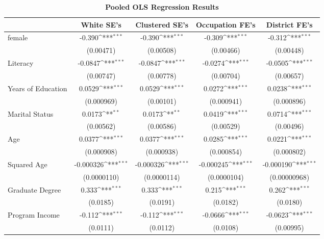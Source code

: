 \begin{table}[htbp]\centering
\def\sym#1{\ifmmode^{#1}\else\(^{#1}\)\fi}
\caption{\textbf{Pooled OLS Regression Results}}
\begin{tabular}{l*{4}{c}}
\hline\hline
                &\multicolumn{1}{c}{\textbf{White SE's}}&\multicolumn{1}{c}{\textbf{Clustered SE's}}&\multicolumn{1}{c}{\textbf{Occupation FE's}}&\multicolumn{1}{c}{\textbf{District FE's}}\\
\hline
female          &   -0.390\sym{***}&   -0.390\sym{***}&   -0.309\sym{***}&   -0.312\sym{***}\\
                &(0.00471)         &(0.00508)         &(0.00466)         &(0.00448)         \\
[1em]
Literacy        &  -0.0847\sym{***}&  -0.0847\sym{***}&  -0.0274\sym{***}&  -0.0505\sym{***}\\
                &(0.00747)         &(0.00778)         &(0.00704)         &(0.00657)         \\
[1em]
Years of Education&   0.0529\sym{***}&   0.0529\sym{***}&   0.0272\sym{***}&   0.0238\sym{***}\\
                &(0.000969)         &(0.00101)         &(0.000941)         &(0.000896)         \\
[1em]
Marital Status  &   0.0173\sym{**} &   0.0173\sym{**} &   0.0419\sym{***}&   0.0714\sym{***}\\
                &(0.00562)         &(0.00586)         &(0.00529)         &(0.00496)         \\
[1em]
Age             &   0.0377\sym{***}&   0.0377\sym{***}&   0.0285\sym{***}&   0.0221\sym{***}\\
                &(0.000908)         &(0.000938)         &(0.000854)         &(0.000802)         \\
[1em]
Squared Age     &-0.000326\sym{***}&-0.000326\sym{***}&-0.000245\sym{***}&-0.000190\sym{***}\\
                &(0.0000110)         &(0.0000114)         &(0.0000104)         &(0.00000968)         \\
[1em]
Graduate Degree &    0.333\sym{***}&    0.333\sym{***}&    0.215\sym{***}&    0.262\sym{***}\\
                & (0.0185)         & (0.0191)         & (0.0182)         & (0.0180)         \\
[1em]
Program Income  &   -0.112\sym{***}&   -0.112\sym{***}&  -0.0666\sym{***}&  -0.0623\sym{***}\\
                & (0.0111)         & (0.0112)         & (0.0108)         &(0.00995)         \\

\end{tabular}
\end{table}
